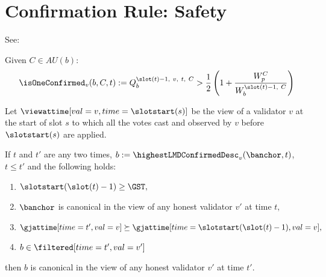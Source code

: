 \documentclass{article}
\begin{document}
\section*{Confirmation Rule: Safety}

See:

\begin{definition}
    Given $C \in AU(b):$
    \[
    \isOneConfirmed_v(b, C, t) := Q^{\slot(t)-1,\ v,\ t,\ C}_{b} > \frac{1}{2}\left(1 + \frac{W^C_p}{W^{\slot(t)-1,\ C}_b}\right)
    \]
\end{definition}

Let $\viewattime[val=v,time=\slotstart(s)]$ be the view of a validator $v$ at the start of slot $s$ to which all the votes cast and observed by $v$ before $\slotstart(s)$ are applied.

\begin{algorithm}[H]
\caption{Highest LMD-GHOST confirmed descendant}
\SetAlgoNoLine
{}

\end{algorithm}


\begin{lemma}
If $t$ and $t'$ are any two times, $b := \highestLMDConfirmedDesc_v(\banchor, t)$, $t \leq t'$ and the following holds:
\begin{enumerate}
    \item $\slotstart(\slot(t) - 1) \geq \GST,$
    \item $\banchor$ is canonical in the view of any honest validator $v'$ at time $t,$
    \item $\gjattime[time=t',val=v] \succeq \gjattime[time=\slotstart(\slot(t) - 1),val=v],$
    \item $b \in \filtered[time=t',val=v']$
\end{enumerate}

then $b$ is canonical in the view of any honest validator $v'$ at time $t'$.
\end{lemma}
\end{document}
